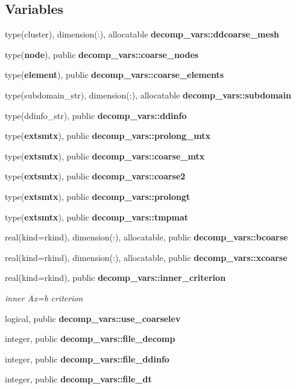\subsection*{Variables}
\begin{DoxyCompactItemize}
\item 
type(cluster), dimension(\+:), allocatable {\bf decomp\+\_\+vars\+::ddcoarse\+\_\+mesh}
\item 
type({\bf node}), public {\bf decomp\+\_\+vars\+::coarse\+\_\+nodes}
\item 
type({\bf element}), public {\bf decomp\+\_\+vars\+::coarse\+\_\+elements}
\item 
type(subdomain\+\_\+str), dimension(\+:), allocatable {\bf decomp\+\_\+vars\+::subdomain}
\item 
type(ddinfo\+\_\+str), public {\bf decomp\+\_\+vars\+::ddinfo}
\item 
type({\bf extsmtx}), public {\bf decomp\+\_\+vars\+::prolong\+\_\+mtx}
\item 
type({\bf extsmtx}), public {\bf decomp\+\_\+vars\+::coarse\+\_\+mtx}
\item 
type({\bf extsmtx}), public {\bf decomp\+\_\+vars\+::coarse2}
\item 
type({\bf extsmtx}), public {\bf decomp\+\_\+vars\+::prolongt}
\item 
type({\bf extsmtx}), public {\bf decomp\+\_\+vars\+::tmpmat}
\item 
real(kind=rkind), dimension(\+:), allocatable, public {\bf decomp\+\_\+vars\+::bcoarse}
\item 
real(kind=rkind), dimension(\+:), allocatable, public {\bf decomp\+\_\+vars\+::xcoarse}
\item 
real(kind=rkind), public {\bf decomp\+\_\+vars\+::inner\+\_\+criterion}
\begin{DoxyCompactList}\small\item\em inner Ax=b criterion \end{DoxyCompactList}\item 
logical, public {\bf decomp\+\_\+vars\+::use\+\_\+coarselev}
\item 
integer, public {\bf decomp\+\_\+vars\+::file\+\_\+decomp}
\item 
integer, public {\bf decomp\+\_\+vars\+::file\+\_\+ddinfo}
\item 
integer, public {\bf decomp\+\_\+vars\+::file\+\_\+dt}
\end{DoxyCompactItemize}
